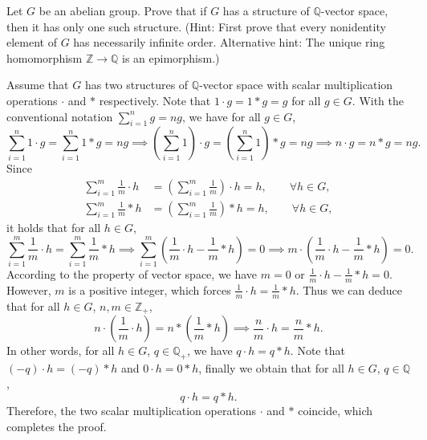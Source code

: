 \documentclass[12pt,letterpaper,boxed]{hmcpset}
\begin{document}
\begin{problem}[5.6]
Let $G$ be an abelian group. Prove that if $G$ has a structure of $\mathbb{Q}$-vector space, then it has only one such structure. (Hint: First prove that every nonidentity element of $G$ has necessarily infinite order. Alternative hint: The unique ring homomorphism $\mathbb{Z} \rightarrow \mathbb{Q}$ is an epimorphism.)
\end{problem}
\begin{solution}
Assume that $G$ has two structures of $\mathbb{Q}$-vector space with scalar multiplication operations $\cdot$ and $*$ respectively. Note that $1\cdot g=1*g=g$ for all $g\in G$. With the conventional notation $\sum_{i=1}^{n}g=ng$, we have for all $g\in G$,
\[
\sum_{i=1}^{n}1\cdot g=\sum_{i=1}^{n}1* g=ng\implies \left(\sum_{i=1}^{n}1\right)\cdot g=\left(\sum_{i=1}^{n}1\right)* g=ng\implies n\cdot g=n*g=ng.
\]
Since
\begin{align*}
\sum_{i=1}^{m}\frac{1}{m}\cdot h&=\left(\sum_{i=1}^{m}\frac{1}{m}\right)\cdot h=h,\qquad\forall h\in G,\\
\sum_{i=1}^{m}\frac{1}{m}* h&=\left(\sum_{i=1}^{m}\frac{1}{m}\right)* h=h,\qquad\forall h\in G,
\end{align*}
it holds that for all $h\in G$,
\[
\sum_{i=1}^{m}\frac{1}{m}\cdot h=\sum_{i=1}^{m}\frac{1}{m}* h\implies\sum_{i=1}^{m}\left(\frac{1}{m}\cdot h-\frac{1}{m}* h\right)=0\implies m\cdot\left(\frac{1}{m}\cdot h-\frac{1}{m}* h\right)=0.
\]
According to the property of vector space, we have $m=0$ or $\frac{1}{m}\cdot h-\frac{1}{m}* h=0$. However, $m$ is a positive integer, which forces $\frac{1}{m}\cdot h=\frac{1}{m}* h$. Thus we can deduce that for all $h\in G$, $n,m\in \mathbb{Z}_+$,
\[
n\cdot \left(\frac{1}{m}\cdot h\right)=n*\left(\frac{1}{m}* h\right)\implies \frac{n}{m}\cdot h=\frac{n}{m}*h.
\]
In other words, for all $h\in G$, $q\in \mathbb{Q}_+$, we have $q\cdot h=q* h$. Note that $(-q)\cdot h=(-q)* h$ and $0\cdot h=0* h$, finally we obtain that for all $h\in G$, $q\in \mathbb{Q}$, 
\[
q\cdot h=q* h.
\]
Therefore, the two scalar multiplication operations $\cdot$ and $*$ coincide, which completes the proof.
\end{solution}
\end{document}
